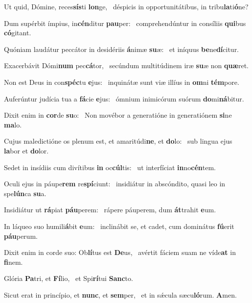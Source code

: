 \item Ut quid, Dómine, reces\textbf{sís}ti \textbf{lon}ge,~\psstar{} déspicis in opportunitátibus, in tribu\textbf{la}ti\textbf{ó}ne?
\item Dum supérbit ímpius, in\textbf{cén}ditur \textbf{pau}per:~\psstar{} comprehendúntur in consíliis \textbf{qui}bus \textbf{có}gitant.
\item Quóniam laudátur peccátor in desidériis \textbf{á}nimæ \textbf{su}æ:~\psstar{} et iníquus \textbf{be}ne\textbf{dí}citur.
\item Exacerbávit Dómi\textbf{num} pec\textbf{cá}tor,~\psstar{} secúndum multitúdinem iræ \textbf{su}æ non \textbf{quæ}ret.
\item Non est Deus in con\textbf{spéc}tu \textbf{e}jus:~\psstar{} inquinátæ sunt viæ illíus in \textbf{om}ni \textbf{tém}pore.
\item Auferúntur judícia tua a \textbf{fá}cie \textbf{e}jus:~\psstar{} ómnium inimicórum suórum \textbf{do}mi\textbf{ná}bitur.
\item Dixit enim in \textbf{cor}de \textbf{su}o:~\psstar{} Non movébor a generatióne in generatiónem \textbf{si}ne \textbf{ma}lo.
\item Cujus maledictióne os plenum est, et amaritúdi\textbf{ne}, et \textbf{do}lo:~\psstar{} sub lingua ejus \textbf{la}bor et \textbf{do}lor.
\item Sedet in insídiis cum divítibus \textbf{in} oc\textbf{cúl}tis:~\psstar{} ut interfíciat \textbf{in}no\textbf{cén}tem.
\item Oculi ejus in páupe\textbf{rem} re\textbf{spí}ciunt:~\psstar{} insidiátur in abscóndito, quasi leo in spe\textbf{lún}ca \textbf{su}a.
\item Insidiátur ut \textbf{rá}piat \textbf{páu}pe\-rem:~\psstar{} rápere páuperem, dum \textbf{át}trahit \textbf{e}um.
\item In láqueo suo humili\textbf{á}bit \textbf{e}um:~\psstar{} inclinábit se, et cadet, cum dominátus \textbf{fú}erit \textbf{páu}perum.
\item Dixit enim in corde suo: Ob\textbf{lí}tus est \textbf{De}us,~\psstar{} avértit fáciem suam ne víde\textbf{at} in \textbf{fi}nem.
\item Glória \textbf{Pa}tri, et \textbf{Fí}lio,~\psstar{} et Spi\textbf{rí}tui \textbf{Sanc}to.
\item Sicut erat in princípio, et \textbf{nunc}, et \textbf{sem}per,~\psstar{} et in sǽcula sæcu\textbf{ló}rum. \textbf{A}men.
